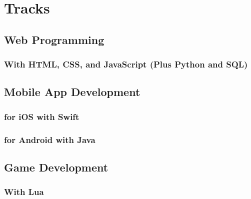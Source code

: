 \section{Tracks}
\subsection{Web Programming}
\subsubsection{With HTML, CSS, and JavaScript (Plus Python and SQL)}

\subsection{Mobile App Development}
\subsubsection{for iOS with Swift}
\subsubsection{for Android with Java}

\subsection{Game Development}
\subsubsection{With Lua}

